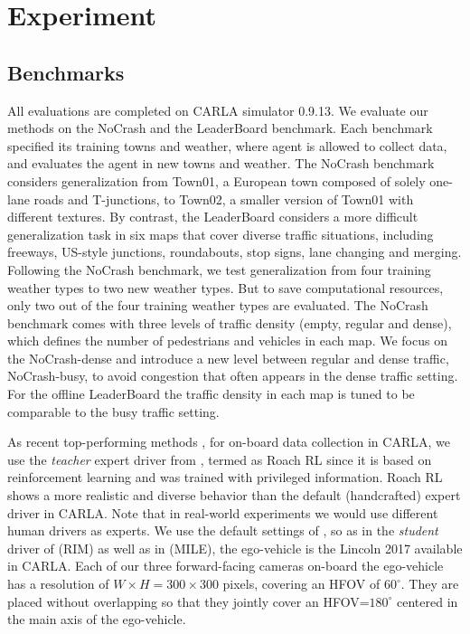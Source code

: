 \section{Experiment}
%	

\subsection{Benchmarks} \label{sec:Dataset}

\hspace{1pc}All evaluations are completed on CARLA simulator \cite{Dosovitskiy:2017} 0.9.13. 
We evaluate our methods on the NoCrash\cite{codevilla2019exploring} and the LeaderBoard benchmark.
Each benchmark specified its training towns and weather, where agent is allowed to collect data, and evaluates the agent in new towns and weather.
The NoCrash benchmark considers generalization from Town01, a European town composed of solely one-lane roads and T-junctions, to Town02, a smaller version of Town01 with different textures.
By contrast, the LeaderBoard considers a more difficult generalization task in six maps that cover diverse traffic situations, including freeways, US-style junctions, roundabouts, stop signs, lane changing and merging.
Following the NoCrash benchmark, we test generalization from four training weather types to two new weather types.
But to save computational resources, only two out of the four training weather types are evaluated.
The NoCrash benchmark comes with three levels of traffic density (empty, regular and dense), which defines the number of pedestrians and vehicles in each map.
We focus on the NoCrash-dense and introduce a new level between regular and dense traffic, NoCrash-busy, to avoid congestion that often appears in the dense traffic setting.
For the offline LeaderBoard the traffic density in each map is tuned to be comparable to the busy traffic setting. 


As recent top-performing methods \cite{Hu:2022}, for on-board data collection in CARLA, we use the \emph{teacher} expert driver from \cite{Zhang:2021}, termed as Roach RL since it is based on reinforcement learning and was trained with privileged information. 
Roach RL shows a more realistic and diverse behavior than the default (handcrafted) expert driver in CARLA. 
Note that in real-world experiments we would use different human drivers as experts. 
We use the default settings of \cite{Zhang:2021}, so as in the \emph{student} driver of \cite{Zhang:2021} (RIM) as well as in \cite{Hu:2022} (MILE), the ego-vehicle is the Lincoln 2017 available in CARLA. 
Each of our three forward-facing cameras on-board the ego-vehicle has a resolution of $W\times H=300\times300$ pixels, covering an HFOV of $60^{\circ}$. 
They are placed without overlapping so that they jointly cover an HFOV=$180^{\circ}$ centered in the main axis of the ego-vehicle. 


